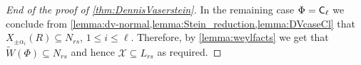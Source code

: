 \begin{proof}[End of the proof of \cref{thm:DennisVaserstein}]
In the remaining case $\Phi=\mathsf{C}_\ell$ we conclude from \cref{lemma:dv-normal,lemma:Stein_reduction,lemma:DVcaseCl} that $X_{\pm \alpha_i}(R) \subseteq N_{rs}$, $1\leq i\leq \ell$.
Therefore, by \cref{lemma:weylfacts} we get that $\widetilde{W}(\Phi) \subseteq N_{rs}$ and hence $\mathcal{X} \subseteq L_{rs}$ as required.
\end{proof}
